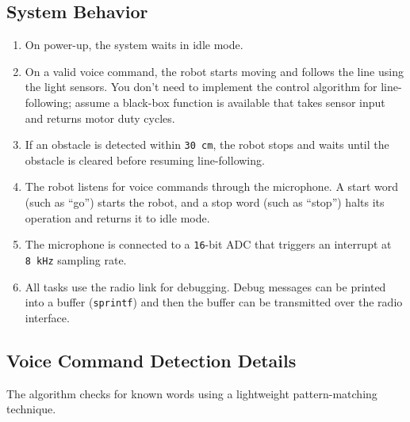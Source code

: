 \vspace*{-1.5em}
\subsection*{System Behavior}
\vspace*{-0.5em}

\begin{enumerate}[topsep=0pt]
      \item On power-up, the system waits in idle mode.

      \item On a valid voice command, the robot starts moving and follows the line using the light sensors.
            You don't need to implement the control algorithm for line-following; assume a black-box function is available that takes sensor input and returns motor duty cycles.

      \item If an obstacle is detected within \texttt{30\,cm}, the robot stops and waits until the obstacle is cleared before resuming line-following.

      \item The robot listens for voice commands through the microphone.
            A start word (such as ``go'') starts the robot, and a stop word (such as ``stop'') halts its operation and returns it to idle mode.

      \item The microphone is connected to a \texttt{16}-bit ADC that triggers an interrupt at \texttt{8\,kHz} sampling rate.

      \item All tasks use the radio link for debugging.
            Debug messages can be printed into a buffer (\texttt{sprintf}) and then the buffer can be transmitted over the radio interface.
\end{enumerate}

\vspace*{-1.5em}
\subsection*{Voice Command Detection Details}
\vspace*{-0.5em}

The algorithm checks for known words using a lightweight pattern-matching technique.

